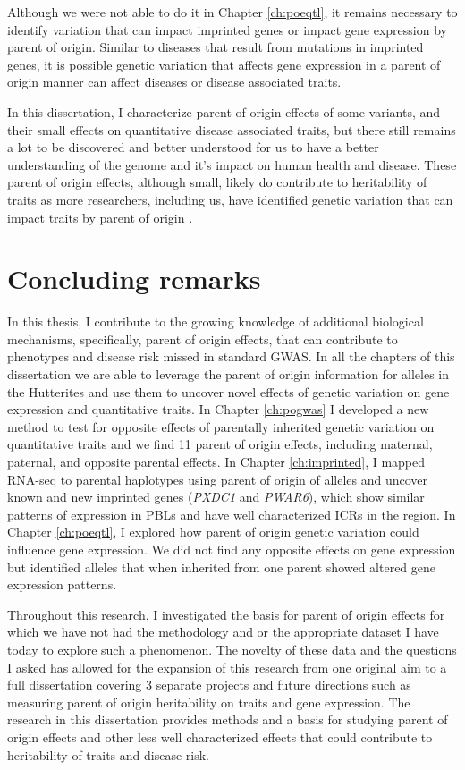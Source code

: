 Although we were not able to do it in Chapter \ref{ch:poeqtl}, it remains necessary to identify variation that can impact imprinted genes or impact gene expression by parent of origin. Similar to diseases that result from mutations in imprinted genes, it is possible genetic variation that affects gene expression in a parent of origin manner can affect diseases or disease associated traits. 

In this dissertation, I characterize parent of origin effects of some variants, and their small effects on quantitative disease associated traits, but there still remains a lot to be discovered and better understood for us to have a better understanding of the genome and it's impact on human health and disease. These parent of origin effects, although small, likely do contribute to heritability of traits as more researchers, including us, have identified genetic variation that can impact traits by parent of origin \cite{Benonisdottir:2016dz,Zoledziewska:2015do,Garg2012a,Kong:2009kk,Mozaffari:dg}. 


\section{Concluding remarks}

In this thesis, I contribute to the growing knowledge of additional biological mechanisms, specifically, parent of origin effects, that can contribute to phenotypes and disease risk missed in standard GWAS. In all the chapters of this dissertation we are able to leverage the parent of origin information for alleles in the Hutterites and use them to uncover novel effects of genetic variation on gene expression and quantitative traits. In Chapter \ref{ch:pogwas} I developed a new method to test for opposite effects of parentally inherited genetic variation on quantitative traits and we find 11 parent of origin effects, including maternal, paternal, and opposite parental effects. In Chapter \ref{ch:imprinted}, I mapped RNA-seq to parental haplotypes using parent of origin of alleles and uncover known and new imprinted genes (\emph{PXDC1} and \emph{PWAR6}), which show similar patterns of expression in PBLs and have well characterized ICRs in the region. In Chapter \ref{ch:poeqtl}, I explored how parent of origin genetic variation could influence gene expression. We did not find any opposite effects on gene expression but identified alleles that when inherited from one parent showed altered gene expression patterns. 

Throughout this research, I investigated the basis for parent of origin effects for which we have not had the methodology and or the appropriate dataset I have today to explore such a phenomenon. The novelty of these data and the questions I asked  has allowed for the expansion of this research from one original aim to a full dissertation covering 3 separate projects and future directions such as measuring parent of origin heritability on traits and gene expression. The research in this dissertation provides methods and a basis for studying parent of origin effects and other less well characterized effects that could contribute to heritability of traits and disease risk. 




